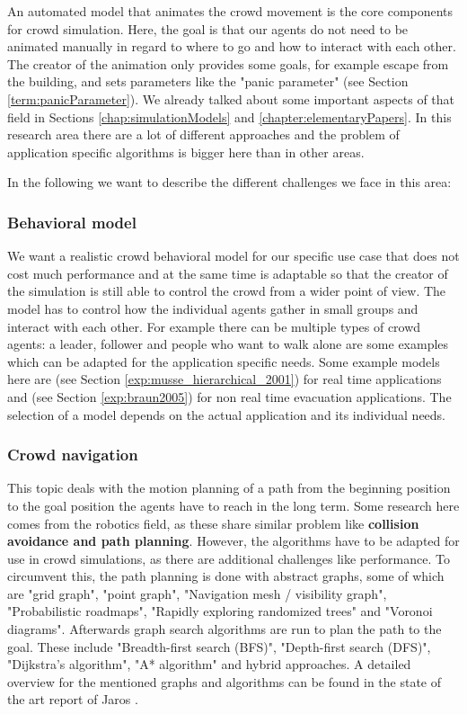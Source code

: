 \documentclass{acmsiggraph}               %
\begin{document}
An automated model that animates the crowd movement is the core components for crowd simulation. Here, the goal is that our agents do not need to be animated manually in regard to where to go and how to interact with each other. The creator of the animation only provides some goals, for example escape from the building, and sets parameters like the "panic parameter" (see Section \ref{term:panicParameter}). We already talked about some important aspects of that field in Sections \ref{chap:simulationModels} and \ref{chapter:elementaryPapers}.  In this research area there are a lot of different approaches and the problem of application specific algorithms is bigger here than in other areas.

In the following we want to describe the different challenges we face in this area:

\subsubsection{Behavioral model}
We want a realistic crowd behavioral model for our specific use case that does not cost much performance and at the same time is adaptable so that the creator of the simulation is still able to control the crowd from a wider point of view. The model has to control how the individual agents gather in small groups and interact with each other. For example there can be multiple types of crowd agents: a leader, follower and people who want to walk alone are some examples which can be adapted for the application specific needs. Some example models here are \cite{musse_hierarchical_2001} (see Section \ref{exp:musse_hierarchical_2001}) for real time applications and \cite{braun_simulating_2005} (see Section \ref{exp:braun2005}) for non real time evacuation applications. The selection of a model depends on the actual application and its individual needs.

\subsubsection{Crowd navigation}
This topic deals with the motion planning of a path from the beginning position to the goal position the agents have to reach in the long term. Some research here comes from the robotics field, as these share similar problem like \textbf{collision avoidance and path planning}. However, the algorithms have to be adapted for use in crowd simulations, as there are additional challenges like performance. To circumvent this, the path planning is done with abstract graphs, some of which are "grid graph", "point graph", "Navigation mesh / visibility graph", "Probabilistic roadmaps", "Rapidly exploring randomized trees" and "Voronoi diagrams". Afterwards graph search algorithms are run to plan the path to the goal. These include "Breadth-ﬁrst search (BFS)",  "Depth-ﬁrst search (DFS)", "Dijkstra’s algorithm", "A* algorithm" and hybrid approaches. A detailed overview for the mentioned graphs and algorithms can be found in the state of the art report of Jaros . 
\end{document}
